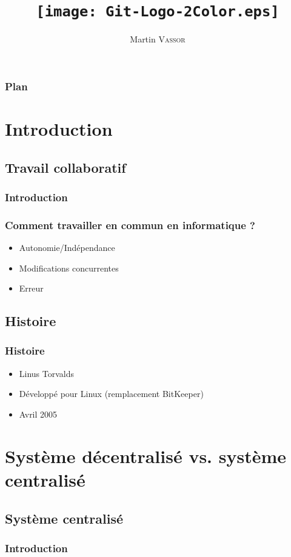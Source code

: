 \documentclass{beamer}
\title{\texttt{[image: Git-Logo-2Color.eps]}}
\author{Martin \textsc{Vassor}}
\begin{document}
\maketitle
\begin{frame}
	\frametitle{Plan}
	\tableofcontents
\end{frame}

\section{Introduction}
\subsection{Travail collaboratif}

\begin{frame}
	\frametitle{Introduction}
	\tableofcontents[currentsection]
\end{frame}

\begin{frame}
	\frametitle{Comment travailler en commun en informatique ?}
	\begin{itemize}
		\item{Autonomie/Ind\'ependance}
		\item{Modifications concurrentes}
		\item{Erreur}
	\end{itemize}
\end{frame}

\subsection{Histoire}
\begin{frame}
	\frametitle{Histoire}
	\begin{itemize}
		\item{Linus Torvalds}
		\item{D\'evelopp\'e pour Linux (remplacement BitKeeper)}
		\item{Avril 2005}
	\end{itemize}
\end{frame}

\section{Syst\`eme d\'ecentralis\'e vs. syst\`eme centralis\'e}
\subsection{Syst\`eme centralis\'e}
\begin{frame}
	\frametitle{Introduction}
	\tableofcontents[currentsection]
\end{frame}
\end{document}
